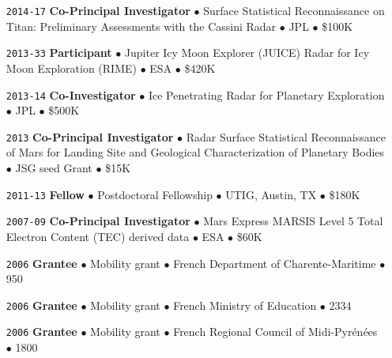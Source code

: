 \begin{itemize}[leftmargin=5.8em, labelsep=1.5em]
    \item[\texttt{2014-17}] \textbf{Co-Principal Investigator} $\bullet$ Surface Statistical Reconnaissance on Titan: Preliminary Assessments with the Cassini Radar $\bullet$ JPL $\bullet$ \$100K
    
    \item[\texttt{2013-33}] \textbf{Participant} $\bullet$ Jupiter Icy Moon  Explorer (JUICE) Radar for Icy Moon Exploration (RIME) $\bullet$ ESA $\bullet$ \$420K
    
    \item[\texttt{2013-14}] \textbf{Co-Investigator} $\bullet$ Ice Penetrating Radar for Planetary Exploration $\bullet$ JPL $\bullet$ \$500K
    
    \item[\texttt{2013}] \textbf{Co-Principal Investigator} $\bullet$ Radar Surface Statistical Reconnaissance of Mars for Landing Site and Geological Characterization of Planetary Bodies $\bullet$ JSG seed Grant $\bullet$ \$15K
    
    \item[\texttt{2011-13}] \textbf{Fellow} $\bullet$ Postdoctoral Fellowship $\bullet$ UTIG, Austin, TX $\bullet$ \$180K
    
    \item[\texttt{2007-09}] \textbf{Co-Principal Investigator} $\bullet$ Mars Express MARSIS Level 5 Total Electron Content (TEC) derived data $\bullet$ ESA $\bullet$ \$60K

    \item[\texttt{2006}] \textbf{Grantee} $\bullet$ Mobility grant $\bullet$ French Department of Charente-Maritime $\bullet$ 950 \texteuro

    \item[\texttt{2006}] \textbf{Grantee} $\bullet$ Mobility grant $\bullet$ French Ministry of Education $\bullet$ 2334 \texteuro
    
    \item[\texttt{2006}] \textbf{Grantee} $\bullet$ Mobility grant $\bullet$ French Regional Council of Midi-Pyrénées $\bullet$ 1800 \texteuro
    
\end{itemize}